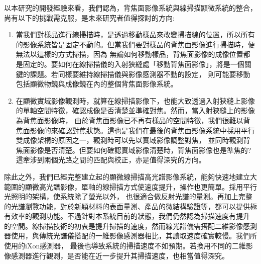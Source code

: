 \documentclass[12pt]{article}
\begin{document}
以本研究的開發經驗來看，我們認為，背焦面影像系統與線掃描顯微系統的整合，尚有以下的挑戰需克服，是未來研究者值得探討的方向:
\begin{enumerate}
    \item 當我們對樣品進行線掃描時，是透過移動樣品來改變掃描線的位置，所以所有的影像系統皆是固定不動的。但當我們要對樣品的背焦面影像進行掃描時，便無法以這樣的方式掃描，因為
    無論如何移動樣品，背焦面影像的成像位置都是固定的。要如何在線掃描儀的入射狹縫處「移動背焦面影像」，將是一個關鍵的課題。若同樣要維持線掃描儀與影像感測器不動的設定，
    則可能要移動包括顯微物鏡與成像鏡在內的整個背焦面影像系統。
    \item 在顯微實域影像觀測時，就算在線掃描影像下，也能大致透過入射狹縫上影像的單軸空間特徵，確認成像是否清楚並準確對焦。然而，當入射狹縫上的影像為背焦面影像時，
    由於背焦面影像已不再有樣品的空間特徵，我們很難以背焦面影像的來確認對焦狀態。這也是我們在最後的背焦面影像系統中採用平行雙成像架構的原因之一，觀測時可以先以實域影像調整對焦，
    並同時觀測背焦面影像是否清楚。但要如何確認實域影像清楚時，背焦面影像也是準焦的? 這牽涉到兩個光路之間的匹配與校正，亦是值得深究的方向。
\end{enumerate}

除此之外，我們已經完整建立起的顯微線掃描高光譜影像系統，能夠快速地建立大範圍的顯微高光譜影像，單軸的線掃描方式使速度提升，操作也更簡單。採用平行光照明的架構，使系統除了螢光以外，
也很適合做反射光譜的量測。再加上完整的光譜瀏覽功能，對於新穎材料的表面量測、產品的微結構驗證等，都可以提供極有效率的觀測功能。不過針對本系統目前的狀態，我們仍然認為掃描速度有提升
的空間。線掃描技術的初衷是提升掃描的速度，然而線光譜儀需搭配二維影像感測器使用，與傳統光譜儀搭配的一維影像感測器相比，其讀取速度確實較慢。我們所使用的iXon感測器，
最後也導致系統的掃描速度不如預期。若換用不同的二維影像感測器進行觀測，是否能在近一步提升其掃描速度，也相當值得深究。

\printbibliography
\end{document}

